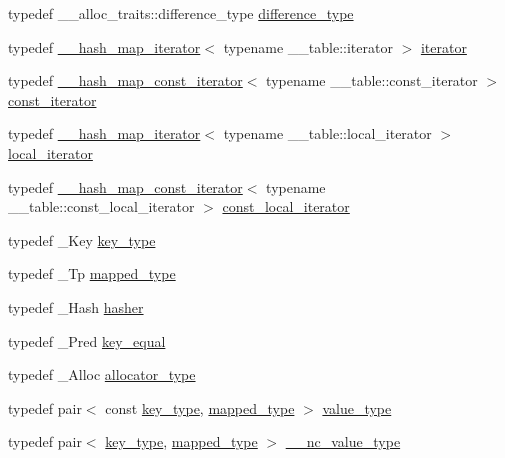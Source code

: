 \begin{DoxyCompactItemize}
typedef \+\_\+\+\_\+alloc\+\_\+traits\+::difference\+\_\+type \hyperlink{classunordered__multimap_ae01816b9f8883bc381dee433486054de}{difference\+\_\+type}
\item 
typedef \hyperlink{class____hash__map__iterator}{\+\_\+\+\_\+hash\+\_\+map\+\_\+iterator}$<$ typename \+\_\+\+\_\+table\+::iterator $>$ \hyperlink{classunordered__multimap_a7b508cae41ac3a258ca80609ec43db47}{iterator}
\item 
typedef \hyperlink{class____hash__map__const__iterator}{\+\_\+\+\_\+hash\+\_\+map\+\_\+const\+\_\+iterator}$<$ typename \+\_\+\+\_\+table\+::const\+\_\+iterator $>$ \hyperlink{classunordered__multimap_a3cb373bd19680f9933781c04905fde39}{const\+\_\+iterator}
\item 
typedef \hyperlink{class____hash__map__iterator}{\+\_\+\+\_\+hash\+\_\+map\+\_\+iterator}$<$ typename \+\_\+\+\_\+table\+::local\+\_\+iterator $>$ \hyperlink{classunordered__multimap_a672fd63d94f807d130e2026d2863d40c}{local\+\_\+iterator}
\item 
typedef \hyperlink{class____hash__map__const__iterator}{\+\_\+\+\_\+hash\+\_\+map\+\_\+const\+\_\+iterator}$<$ typename \+\_\+\+\_\+table\+::const\+\_\+local\+\_\+iterator $>$ \hyperlink{classunordered__multimap_a4813834c894681f449b5afe718336482}{const\+\_\+local\+\_\+iterator}
\item 
typedef \+\_\+\+Key \hyperlink{classunordered__multimap_a2902747087a03531493d30e9840f67d9}{key\+\_\+type}
\item 
typedef \+\_\+\+Tp \hyperlink{classunordered__multimap_a50bc9bc504d96ff3c7ca7db1f428eb5e}{mapped\+\_\+type}
\item 
typedef \+\_\+\+Hash \hyperlink{classunordered__multimap_a93affc33f5ee930cff353ff62d20daef}{hasher}
\item 
typedef \+\_\+\+Pred \hyperlink{classunordered__multimap_aeed817e3baaf0771b8336eb2477f4f02}{key\+\_\+equal}
\item 
typedef \+\_\+\+Alloc \hyperlink{classunordered__multimap_a821ff3be687cecd9ef325efa93759c19}{allocator\+\_\+type}
\item 
typedef pair$<$ const \hyperlink{classunordered__multimap_a2902747087a03531493d30e9840f67d9}{key\+\_\+type}, \hyperlink{classunordered__multimap_a50bc9bc504d96ff3c7ca7db1f428eb5e}{mapped\+\_\+type} $>$ \hyperlink{classunordered__multimap_a106d390dc0deafc47f10d3943b247ee6}{value\+\_\+type}
\item 
typedef pair$<$ \hyperlink{classunordered__multimap_a2902747087a03531493d30e9840f67d9}{key\+\_\+type}, \hyperlink{classunordered__multimap_a50bc9bc504d96ff3c7ca7db1f428eb5e}{mapped\+\_\+type} $>$ \hyperlink{classunordered__multimap_a02f7a45f9e19d7a13e361aa3509af744}{\+\_\+\+\_\+nc\+\_\+value\+\_\+type}

\end{DoxyCompactItemize}
